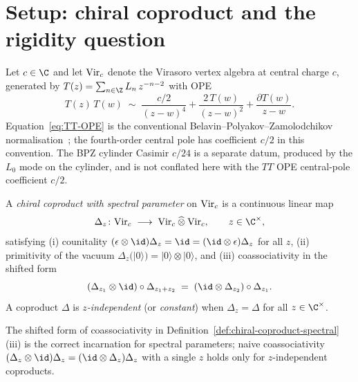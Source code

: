 \section{Setup: chiral coproduct and the rigidity question}
\label{sec:conformal-anomaly-setup}

Let $c \in \C$ and let $\mathrm{Vir}_{c}$ denote the Virasoro vertex algebra at
central charge $c$, generated by $T(z) = \sum_{n \in \Z} L_{n}\,
z^{-n-2}$ with OPE
\begin{equation}
\label{eq:TT-OPE}
T(z)\,T(w) \;\sim\;
\frac{c/2}{(z-w)^{4}}
+ \frac{2\,T(w)}{(z-w)^{2}}
+ \frac{\partial T(w)}{z - w}.
\end{equation}
Equation~\eqref{eq:TT-OPE} is the conventional Belavin--Polyakov--Zamolodchikov
normalisation~\cite{BPZ84}; the fourth-order central pole has
coefficient $c/2$ in this convention. The BPZ cylinder Casimir
$c/24$ is a separate datum, produced by the $L_{0}$ mode on the
cylinder, and is not conflated here with the $TT$ OPE central-pole
coefficient $c/2$.

\begin{definition}
\label{def:chiral-coproduct-spectral}
A \emph{chiral coproduct with spectral parameter} on $\mathrm{Vir}_{c}$ is a
continuous linear map
\[
\Delta_{z} \colon \Virc \;\longrightarrow\;
\Virc \mathbin{\widehat{\otimes}} \Virc,
\qquad z \in \C^{\times},
\]
satisfying (i) counitality $(\epsilon \otimes \id)\Delta_{z} =
\id = (\id \otimes \epsilon)\Delta_{z}$ for all $z$, (ii) primitivity
of the vacuum $\Delta_{z}(|0\rangle) = |0\rangle \otimes |0\rangle$,
and (iii) coassociativity in the shifted form
\[
(\Delta_{z_{1}} \otimes \id) \circ \Delta_{z_{1} + z_{2}}
\;=\;
(\id \otimes \Delta_{z_{2}}) \circ \Delta_{z_{1}}.
\]
A coproduct $\Delta$ is \emph{$z$-independent} (or \emph{constant})
when $\Delta_{z} = \Delta$ for all $z \in \C^{\times}$.
\end{definition}

\begin{remark}
\label{rem:shifted-coassoc-fm39}
The shifted form of coassociativity in
Definition~\ref{def:chiral-coproduct-spectral}(iii) is the correct
incarnation for spectral parameters; naive coassociativity
$(\Delta_{z} \otimes \id)\Delta_{z} = (\id \otimes \Delta_{z})\Delta_{z}$
with a single $z$ holds only for $z$-independent coproducts.
\end{remark}

